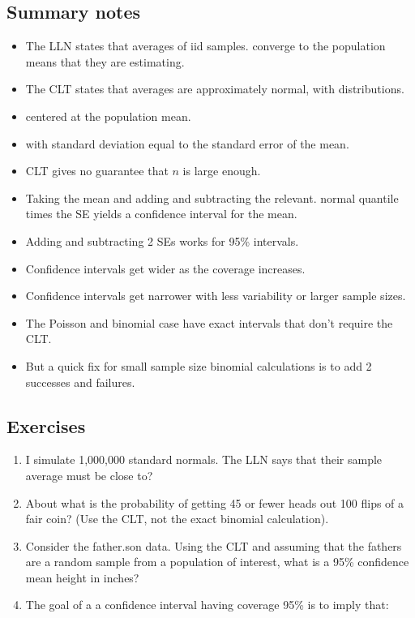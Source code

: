 \documentclass[]{article}
\begin{document}
\subsection{Summary notes}\label{summary-notes-4}

\begin{itemize}
\itemsep1pt\parskip0pt
\item
  The LLN states that averages of iid samples. converge to the
  population means that they are estimating.
\item
  The CLT states that averages are approximately normal, with
  distributions.
\item
  centered at the population mean.
\item
  with standard deviation equal to the standard error of the mean.
\item
  CLT gives no guarantee that $n$ is large enough.
\item
  Taking the mean and adding and subtracting the relevant. normal
  quantile times the SE yields a confidence interval for the mean.
\item
  Adding and subtracting 2 SEs works for 95\% intervals.
\item
  Confidence intervals get wider as the coverage increases.
\item
  Confidence intervals get narrower with less variability or larger
  sample sizes.
\item
  The Poisson and binomial case have exact intervals that don't require
  the CLT.
\item
  But a quick fix for small sample size binomial calculations is to add
  2 successes and failures.
\end{itemize}

\subsection{Exercises}\label{exercises-6}

\begin{enumerate}
\def\labelenumi{\arabic{enumi}.}
\itemsep1pt\parskip0pt
\item
  I simulate 1,000,000 standard normals. The LLN says that their sample
  average must be close to?
\item
  About what is the probability of getting 45 or fewer heads out 100
  flips of a fair coin? (Use the CLT, not the exact binomial
  calculation).
\item
  Consider the father.son data. Using the CLT and assuming that the
  fathers are a random sample from a population of interest, what is a
  95\% confidence mean height in inches?
\item
  The goal of a a confidence interval having coverage 95\% is to imply
  that:
\end{enumerate}
\end{document}
